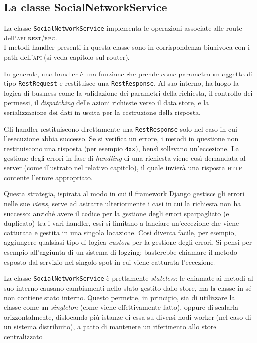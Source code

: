 \documentclass[a4paper,8pt]{article} %
\def\code#1{\texttt{#1}}
\begin{document}
\subsection{La classe SocialNetworkService}
La classe \code{SocialNetworkService} implementa le operazioni associate alle route dell'\textsc{api} \textsc{rest}/\textsc{rpc}.\\ I metodi handler presenti in questa classe
sono in corrispondenza biunivoca con i path dell'\textsc{api} (si veda capitolo sul router).

\par In generale, uno handler è una funzione che prende come parametro un oggetto di tipo \code{RestRequest} e restituisce una \code{RestResponse}. Al suo interno,
ha luogo la logica di business come la validazione dei parametri della richiesta, il controllo dei permessi, il \emph{dispatching} delle azioni richieste verso il data store, e la
serializzazione dei dati in uscita per la costruzione della risposta.

\par Gli handler restituiscono direttamente una \code{RestResponse} solo nel caso in cui l'esecuzione abbia successo. Se si verifica un errore, i metodi in questione non restituiscono
una risposta (per esempio \code{4xx}), bensì sollevano un'eccezione. La gestione degli errori in fase di \emph{handling} di una richiesta viene così demandata
al server (come illustrato nel relativo capitolo), il quale invierà una risposta \textsc{\textsc{http}} contente l'errore appropriato.
\par Questa strategia, ispirata al modo in cui il framework \href{https://www.djangoproject.com/}{Django} gestisce gli errori nelle sue \emph{views}, serve ad astrarre ulteriormente i casi in cui la richiesta non ha successo:
anziché avere il codice per la gestione degli errori sparpagliato (e duplicato) tra i vari handler, essi si limitano a lanciare un'eccezione che viene catturata e gestita in una singola locazione.
Così diventa
facile, per esempio, aggiungere qualsiasi tipo di logica \emph{custom} per la gestione degli errori. Si pensi per esempio all'aggiunta di un sistema di logging: basterebbe chiamare il metodo esposto dal servizio nel singolo spot in cui
viene catturata l'eccezione.

\par La classe \code{SocialNetworkService} è prettamente \emph{stateless}: le chiamate ai metodi al suo interno causano cambiamenti nello stato gestito dallo store, ma la classe
in sé non contiene stato interno. Questo permette, in principio, sia di utilizzare la classe come un \emph{singleton} (come viene effettivamente fatto), oppure di scalarla
orizzontalmente, dislocando più istanze di essa su diversi nodi worker (nel caso di un sistema distribuito), a patto di mantenere un riferimento allo store centralizzato.
\end{document}
